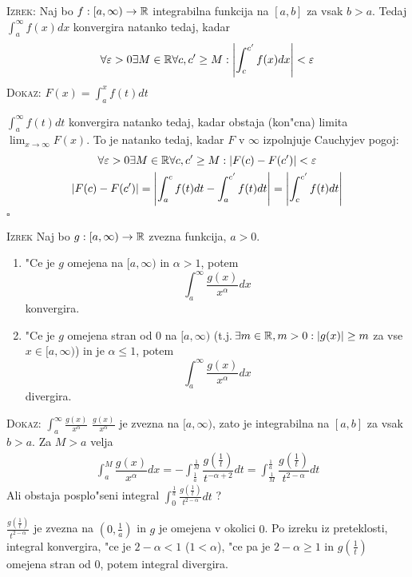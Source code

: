 \textsc{Izrek:} Naj bo $f: [a, \infty) \to \mathbb{R}$ integrabilna funkcija na $[a, b]$  za vsak $b > a$. Tedaj $\int_a^\infty f(x) dx$ konvergira natanko tedaj, kadar
\begin{equation*}
\forall \varepsilon > 0 \exists M \in \mathbb{R} \forall c, c' \geq M: \left| \int_c^{c'} f(x) dx \right| < \varepsilon
\end{equation*}
\textsc{Dokaz:} $F(x) = \int_a^x f(t) dt$

$\int_a^\infty f(t) dt$ konvergira natanko tedaj, kadar obstaja (kon"cna) limita $\lim_{x \to \infty} F(x)$. To je natanko tedaj, kadar $F$ v $\infty$ izpolnjuje Cauchyjev pogoj:
\begin{gather*}
\forall \varepsilon > 0 \exists M \in \mathbb{R} \forall c, c' \geq M: |F(c) - F(c')| < \varepsilon \\
|F(c) - F(c')| = \left| \int_a^c f(t) dt - \int_a^{c'} f(t) dt \right| = \left| \int_c^{c'} f(t) dt \right|
\end{gather*}
\hfill $\square$

\textsc{Izrek} Naj bo $g: [a, \infty) \to \mathbb{R}$ zvezna funkcija, $a > 0$.
\begin{enumerate}[(1)]
	\item "Ce je $g$ omejena na $[a, \infty)$ in $\alpha > 1$, potem
	\begin{equation*}
	\int_a^\infty \dfrac{g(x)}{x^\alpha} dx
	\end{equation*}
	konvergira.
	
	\item "Ce je $g$ omejena stran od 0 na $[a, \infty)$ (t.j.\,$\exists m \in \mathbb{R}, m > 0: |g(x)| \geq m$ za vse $x \in [a, \infty)$) in je $\alpha \leq 1$, potem
	\begin{equation*}
	\int_a^\infty \dfrac{g(x)}{x^\alpha} dx
	\end{equation*}
	divergira.
\end{enumerate}
\textsc{Dokaz:} $\int_a^\infty \frac{g(x)}{x^\alpha}$ \quad $\frac{g(x)}{x^\alpha}$ je zvezna na $[a, \infty)$, zato je integrabilna na $[a, b]$ za vsak $b > a$. Za $M > a$ velja
\begin{gather*}
\int_a^M \dfrac{g(x)}{x^\alpha} dx = - \int_{\frac{1}{a}}^{\frac{1}{M}} \dfrac{g \left( \frac{1}{t} \right)}{t^{-\alpha + 2}} dt = \int_{\frac{1}{M}}^{\frac{1}{a}} \dfrac{g\left( \frac{1}{t} \right)}{t^{2 - \alpha}}dt 
\end{gather*}
Ali obstaja posplo"seni integral $\int_0^\frac{1}{a} \frac{g\left(\frac{1}{t}\right)}{t^{2 - \alpha}} dt$ ?

$\frac{g \left(\frac{1}{t}\right)}{t^{2 - \alpha}}$ je zvezna na $(0, \frac{1}{a})$ in $g$ je omejena v okolici $0$. Po izreku iz preteklosti, integral konvergira, "ce je $2 - \alpha < 1$ ($1 < \alpha$), "ce pa je $2 - \alpha \geq 1$ in $g(\frac{1}{t})$ omejena stran od 0, potem integral divergira.

